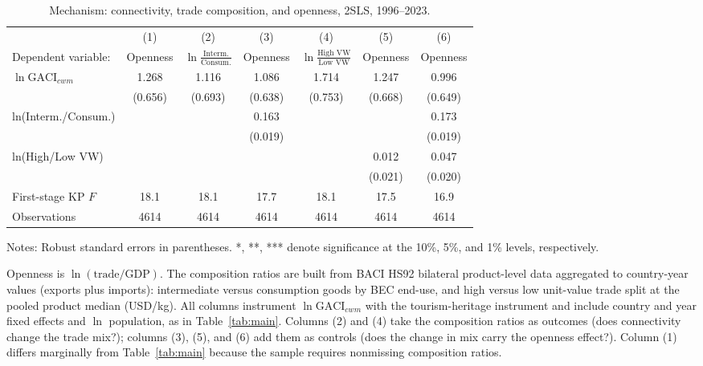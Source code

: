 \begin{table}[t]
\centering
\caption{Mechanism: connectivity, trade composition, and openness, 2SLS,
1996--2023.}
\label{tab:mechanism}
\begin{threeparttable}
\small
\begin{tabular}{lcccccc}
\toprule
 & (1) & (2) & (3) & (4) & (5) & (6) \\
Dependent variable: & Openness & $\ln\frac{\text{Interm.}}{\text{Consum.}}$ & Openness & $\ln\frac{\text{High VW}}{\text{Low VW}}$ & Openness & Openness \\
\midrule
$\ln\mathrm{GACI}_{cwm}$ & 1.268\sym{*} & 1.116 & 1.086\sym{*} & 1.714\sym{**} & 1.247\sym{*} & 0.996 \\
 & (0.656) & (0.693) & (0.638) & (0.753) & (0.668) & (0.649) \\
ln(Interm./Consum.) &  &  & 0.163\sym{***} &  &  & 0.173\sym{***} \\
 &  &  & (0.019) &  &  & (0.019) \\
ln(High/Low VW) &  &  &  &  & 0.012 & 0.047\sym{**} \\
 &  &  &  &  & (0.021) & (0.020) \\
\midrule
First-stage KP $F$ & 18.1 & 18.1 & 17.7 & 18.1 & 17.5 & 16.9 \\
Observations & 4614 & 4614 & 4614 & 4614 & 4614 & 4614 \\
\bottomrule
\end{tabular}
\begin{tablenotes}\footnotesize
\item Notes: Robust standard errors in parentheses. *, **, *** denote
significance at the 10\%, 5\%, and 1\% levels, respectively.
\item Openness is $\ln(\text{trade}/\text{GDP})$. The composition ratios
are built from BACI HS92 bilateral product-level data aggregated to
country-year values (exports plus imports): intermediate versus
consumption goods by BEC end-use, and high versus low unit-value trade
split at the pooled product median (USD/kg). All columns instrument
$\ln\mathrm{GACI}_{cwm}$ with the tourism-heritage instrument and include
country and year fixed effects and $\ln$ population, as in
Table~\ref{tab:main}. Columns (2) and (4) take the composition ratios as
outcomes (does connectivity change the trade mix?); columns (3), (5),
and (6) add them as controls (does the change in mix carry the openness
effect?). Column (1) differs marginally from Table~\ref{tab:main}
because the sample requires nonmissing composition ratios.
\end{tablenotes}
\end{threeparttable}
\end{table}


